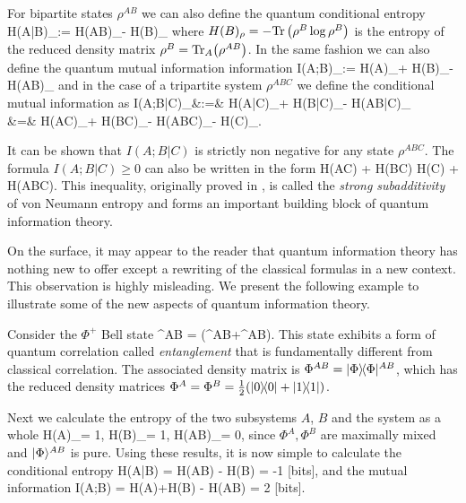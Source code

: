 \documentclass[aps,11pt,twoside,letterpaper]{article}
\def\Tr{\textup{Tr}}
\begin{document}
			
			For bipartite states $\rho^{AB}$ we can also define the quantum conditional entropy
			\be
				H(A|B)_\rho 	:= 		H(AB)_\rho - H(B)_\rho					\label{cond-entrpy} 
			\ee
			where $H(B)_\rho = -\Tr\left(\rho^B\log\rho^B\right)$ is the entropy of the reduced density matrix
			$\rho^B = \Tr_A\!\left( \rho^{AB}\right)$. In the same fashion we can also define the 
			quantum mutual information information
			\be
				I(A;B)_\rho 	:=		H(A)_\rho + H(B)_\rho - H(AB)_\rho 
			\ee
			and in the case of a tripartite system $\rho^{ABC}$ we define the conditional mutual information 
			as 
			\bea
				I(A;B|C)_\rho 	&:=&	H(A|C)_\rho + H(B|C)_\rho - H(AB|C)_\rho \label{cond-mut-info} \\
								&=&		H(AC)_\rho + H(BC)_\rho - H(ABC)_\rho - H(C)_\rho.
			\eea
		    
			\noindent It can be shown that $I(A;B|C)$ is strictly non negative for any state $\rho^{ABC}$.
			The formula $I(A;B|C)\geq 0$ can also be written in the form
			\be	\label{strong-subadditivity}
				H(AC) + H(BC) 	\geq	H(C) + H(ABC).
			\ee
			This inequality, originally proved in \cite{LR73}, is called the \emph{strong subadditivity} of von Neumann 
			entropy and forms an important building block of quantum information theory.
			
			
			On the surface, it may appear to the reader that quantum information theory has nothing new to offer except 
			a rewriting of the classical formulas in a new context.
			This observation is highly misleading.
			We present the following example to illustrate some of the new aspects of quantum information theory.
			
			\begin{example}	\label{example:EPR-pair}
				Consider the $\Phi^{+}$\! Bell state 
				\be
					\ket{\Phi}^{AB} = (^{AB}+\ket{11}^{AB}).
				\ee
				This state exhibits a form of quantum correlation called \emph{entanglement} that is fundamentally
				different from classical correlation.
				The associated density matrix is $\Phi^{AB} = | \Phi \rangle\!\langle \Phi |^{AB}$, which has
				the reduced density matrices $\Phi^A = \Phi^B = \tfrac{1}{2}(| 0 \rangle\!\langle 0 | + | 1 \rangle\!\langle 1 |)$.
				
				Next we calculate the entropy of the two subsystems $A$, $B$ and the system as a whole 
				\be
					H(A)_\Phi = 1, 	\qquad
					H(B)_\Phi = 1, 	\qquad
					H(AB)_\Phi = 0,
				\ee
				since $\Phi^A,\Phi^B$ are maximally mixed and $| \Phi \rangle^{AB}$ is pure.
				Using these results, it is now simple to calculate the conditional entropy
				\be	\label{cond-ent-can-be-neg}
					H(A|B)	=	H(AB) - H(B)	= -1 \textup{ [bits]},
				nd the mutual information
				\be	\label{mutual-inf-can-be-2}
					I(A;B)	=	H(A)+H(B) - H(AB)	= 2 \textup{ [bits]}.
				\ee
			\end{example}
			
\end{document}
